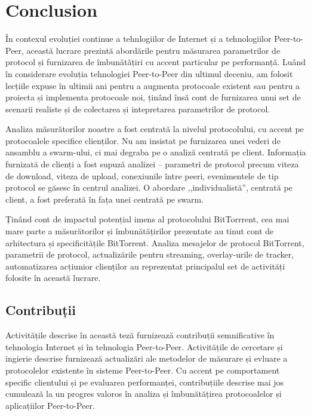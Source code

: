 
\chapter{Conclusion}
\label{chapter:conclusion}

În contexul evoluției continue a tehnlogiilor de Internet și a tehnologiilor
Peer-to-Peer, această lucrare prezintă abordările pentru măsurarea
parametrilor de protocol și furnizarea de îmbunătățiri cu accent particular pe
performanță. Luând în considerare evoluția tehnologiei Peer-to-Peer din
ultimul deceniu, am folosit lecțiile expuse în ultimii ani pentru a augmenta
protocoale existent sau pentru a proiecta și implementa protocoale noi, ținând
însă cont de furnizarea unui set de scenarii realiste și de colectarea și
intepretarea parametrilor de protocol.

Analiza măsurătorilor noastre a fost centrată la nivelul protocolului, cu
accent pe protocoalele specifice clienților. Nu am insistat pe furnizarea unei
vederi de ansamblu a swarm-ului, ci mai degraba pe o analiză centrată pe
client. Informația furnizată de clienți a fost supuză analizei -- parametri de
protocol precum viteza de download, viteza de upload, conexiunile între peeri,
evenimentele de tip protocol se găsesc în centrul analizei. O abordare
,,individualistă'', centrată pe client, a fost preferată în fața unei centrată
pe swarm.

Ținând cont de impactul potențial imens al protocolului BitTorrrent, cea mai
mare parte a măsurătorilor și îmbunătățirilor prezentate au tinut cont de
arhitectura și specificitățile BitTorrent. Analiza mesajelor de protocol
BitTorrent, parametrii de protocol, actualizările pentru streaming,
overlay-urile de tracker, automatizarea acțiunior clienților au reprezentat
principalul set de activități folosite în această lucrare.

\section{Contribuții}
\label{sec:conclusion:contributions}

Activitățile descrise în această teză furnizează contribuții semnificative în
tehnologia Internet și în tehnologia Peer-to-Peer. Activitățile de cercetare
și ingierie descrise furnizează actualizări ale metodelor de măsurare și
evluare a protocolelor existente în sisteme Peer-to-Peer. Cu accent pe
comportament specific clientului și pe evaluarea performanței, contribuțiile
descrise mai jos cumulează la un progres valoros în analiza și îmbunătățirea
protocoalelor și aplicațiilor Peer-to-Peer.

